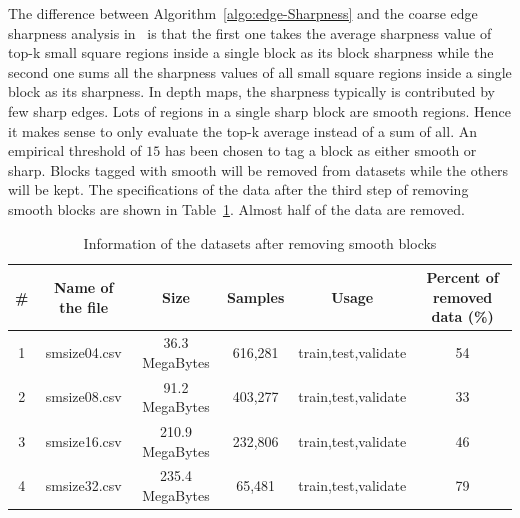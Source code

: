 The difference between Algorithm~\ref{algo:edge-Sharpness}
and the coarse edge sharpness analysis in~\parencite{RN78}
is that the first one takes the average sharpness value
of top-k small square regions inside a single block as its
block sharpness while the second one sums all
the sharpness values of all small square regions inside a
single block as its sharpness.
In depth maps,
the sharpness typically is contributed by few sharp edges.
Lots of regions in a single sharp block are smooth regions.
Hence it makes sense to only evaluate the top-k average
instead of a sum of all.
An empirical threshold of \(15\) has been chosen to tag a block
as either smooth or sharp.
Blocks tagged with smooth will be removed from datasets
while the others will be kept.
The specifications of the data after the third step
of removing smooth blocks
are shown in Table~\ref{tab:datasets-after-third-step}.
Almost half of the data are removed.
\begin{table}[H]
    \caption{Information of the datasets after removing smooth blocks}
    \bigskip\label{tab:datasets-after-third-step}
    \centering
    \begin{tabular}{c c c c c c}
        \toprule
        \# & Name of the file & Size & Samples & Usage & Percent of removed data (\%) \\
        \midrule
        1 & smsize04.csv & 36.3 MegaBytes & 616,281 & train,test,validate & 54 \\
        2 & smsize08.csv & 91.2 MegaBytes & 403,277 & train,test,validate & 33 \\
        3 & smsize16.csv & 210.9 MegaBytes & 232,806 & train,test,validate & 46 \\
        4 & smsize32.csv & 235.4 MegaBytes & 65,481 & train,test,validate & 79 \\
        \bottomrule
    \end{tabular}
\end{table}

